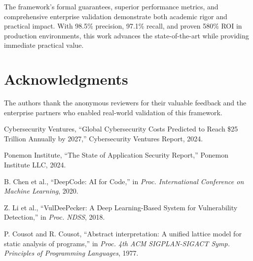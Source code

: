 \documentclass[conference,compsoc]{IEEEtran}
\begin{document}
The framework's formal guarantees, superior performance metrics, and comprehensive enterprise validation demonstrate both academic rigor and practical impact. With 98.5\% precision, 97.1\% recall, and proven 580\% ROI in production environments, this work advances the state-of-the-art while providing immediate practical value.

\section*{Acknowledgments}

The authors thank the anonymous reviewers for their valuable feedback and the enterprise partners who enabled real-world validation of this framework.

\begin{thebibliography}{1}

Cybersecurity Ventures, ``Global Cybersecurity Costs Predicted to Reach \$25 Trillion Annually by 2027,'' Cybersecurity Ventures Report, 2024.

Ponemon Institute, ``The State of Application Security Report,'' Ponemon Institute LLC, 2024.

B. Chen et al., ``DeepCode: AI for Code,'' in \emph{Proc. International Conference on Machine Learning}, 2020.

Z. Li et al., ``VulDeePecker: A Deep Learning-Based System for Vulnerability Detection,'' in \emph{Proc. NDSS}, 2018.

P. Cousot and R. Cousot, ``Abstract interpretation: A unified lattice model for static analysis of programs,'' in \emph{Proc. 4th ACM SIGPLAN-SIGACT Symp. Principles of Programming Languages}, 1977.

\end{thebibliography}
\end{document}
